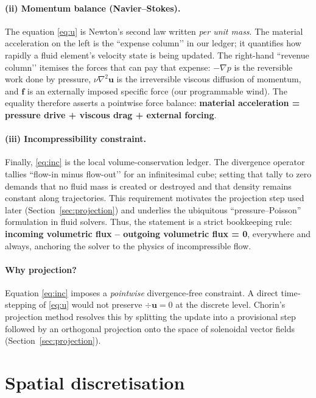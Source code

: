 \documentclass[11pt]{article}
\begin{document}
\paragraph{(ii) Momentum balance (Navier–Stokes).}The equation \eqref{eq:u} is Newton’s second law written \emph{per unit mass}.
The material acceleration on the left is the ``expense column’’ in our
ledger; it quantifies how rapidly a fluid element’s velocity state is
being updated.
The right-hand ``revenue column’’ itemises the forces that can pay that
expense: \(-\nabla p\) is the reversible work done by pressure,
\(\nu\nabla^{2}\bm{u}\) is the irreversible viscous diffusion of
momentum, and \(\bm{f}\) is an externally imposed specific force (our
programmable wind).
The equality therefore asserts a pointwise force balance:
\textbf{material acceleration = pressure drive + viscous drag + external forcing}.


\paragraph{(iii) Incompressibility constraint.}
Finally, \eqref{eq:inc} is the local volume-conservation ledger.
The divergence operator tallies ``flow-in minus flow-out’’ for an
infinitesimal cube; setting that tally to zero demands that no fluid
mass is created or destroyed and that density remains constant along
trajectories.
This requirement motivates the projection step used later
(Section~\ref{sec:projection}) and underlies the ubiquitous
``pressure–Poisson'' formulation in fluid solvers. Thus, the statement is a strict bookkeeping rule:
\textbf{incoming volumetric flux – outgoing volumetric flux = 0},
everywhere and always, anchoring the solver to the physics of
incompressible flow.

\medskip
\paragraph{Why projection?}
Equation \eqref{eq:inc} imposes a \emph{pointwise} divergence‐free
constraint.  A direct time‐stepping of \eqref{eq:u} would not preserve
$\div\bm{u}=0$ at the discrete level.
Chorin’s projection method resolves this by splitting the update into
a provisional step followed by an orthogonal projection onto the space
of solenoidal vector fields (Section~\ref{sec:projection}).

\section{Spatial discretisation}\label{sec:disc}
\end{document}
